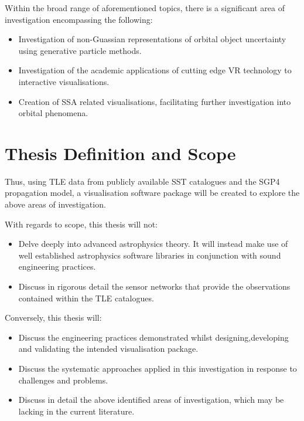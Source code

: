 \documentclass[12pt,openany,a4paper]{book}
\begin{document}
		Within the broad range of aforementioned topics, there is a significant area of investigation encompassing the following:
		
		\begin{itemize}
			\item Investigation of non-Guassian representations of orbital object uncertainty using generative particle methods.
			\item Investigation of the academic applications of cutting edge VR technology to interactive visualisations.
			\item Creation of SSA related visualisations, facilitating further investigation into orbital phenomena.
		\end{itemize}
		
		\section{Thesis Definition and Scope}
		
		Thus, using TLE data from publicly available SST catalogues and the SGP4 propagation model, a visualisation software package will be created to explore the above areas of investigation. \newline
		
		With regards to scope, this thesis will not: 
		\begin{itemize}
			\item Delve deeply into advanced astrophysics theory. It will instead make use of well established astrophysics software libraries in conjunction with sound engineering practices. 
			\item Discuss in rigorous detail the sensor networks that provide the observations contained within the TLE catalogues.
		\end{itemize}
		
		Conversely, this thesis will:
		
		\begin{itemize}
			\item Discuss the engineering practices demonstrated whilst designing,developing and validating the intended visualisation package. 
			\item Discuss the systematic approaches applied in this investigation in response to challenges and problems.
			\item Discuss in detail the above identified areas of investigation, which may be lacking in the current literature.
		\end{itemize}
				
\end{document}
